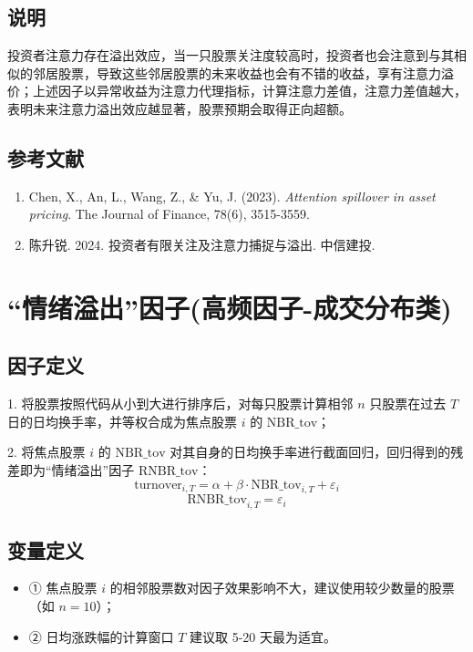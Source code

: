 \documentclass{article}
\begin{document}
\subsection{说明}
投资者注意力存在溢出效应，当一只股票关注度较高时，投资者也会注意到与其相似的邻居股票，导致这些邻居股票的未来收益也会有不错的收益，享有注意力溢价；上述因子以异常收益为注意力代理指标，计算注意力差值，注意力差值越大，表明未来注意力溢出效应越显著，股票预期会取得正向超额。

\subsection{参考文献}
\begin{enumerate}
    \item Chen, X., An, L., Wang, Z., \& Yu, J. (2023). \textit{Attention spillover in asset pricing}. The Journal of Finance, 78(6), 3515-3559.
    \item 陈升锐. 2024. 投资者有限关注及注意力捕捉与溢出. 中信建投.
\end{enumerate}

\section{“情绪溢出”因子(高频因子-成交分布类)}

\subsection{因子定义}

1. 将股票按照代码从小到大进行排序后，对每只股票计算相邻 \( n \) 只股票在过去 \( T \) 日的日均换手率，并等权合成为焦点股票 \( i \) 的 \( \mathrm{NBR\_tov} \)；

2. 将焦点股票 \( i \) 的 \( \mathrm{NBR\_tov} \) 对其自身的日均换手率进行截面回归，回归得到的残差即为“情绪溢出”因子 \( \mathrm{RNBR\_tov} \)：
\begin{equation}
    \mathrm{turnover}_{i,T} = \alpha + \beta \cdot \mathrm{NBR\_tov}_{i,T} + \varepsilon_i
\end{equation}
\begin{equation}
    \mathrm{RNBR\_tov}_{i,T} = \varepsilon_i
\end{equation}

\subsection{变量定义}
\begin{itemize}
    \item ① 焦点股票 \( i \) 的相邻股票数对因子效果影响不大，建议使用较少数量的股票（如 \( n=10 \)）；
    \item ② 日均涨跌幅的计算窗口 \( T \) 建议取 5-20 天最为适宜。
\end{itemize}
\end{document}

